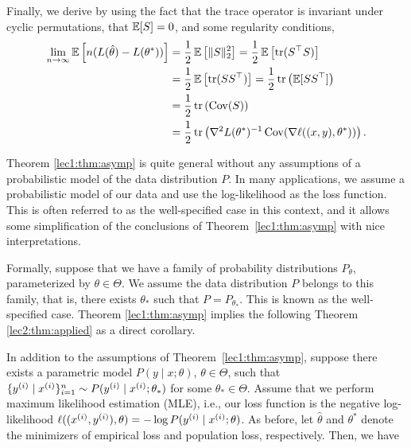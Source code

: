 Finally, we derive  by using the fact that the trace operator is invariant under cyclic permutations,  that $\Exp [S] = 0$, and some regularity conditions,
\begin{align}
    \lim_{n \to \infty} \Exp \left[ n (L(\hat \theta) - L(\theta^*)) \right] &= \frac12 \Exp\left[ \|S\|_2^2 \right] = \frac12 \Exp \left[ \tr(S^\top S) \right] \\
    &= \frac12 \Exp \left[ \tr(S S^\top) \right]  = \frac12 \tr \left(\Exp[S S^\top] \right) \\
    &= \frac12 \tr \left( \Cov(S) \right) \\
    &= \frac12 \tr\left( \nabla^2 L(\theta^*)^{-1} \Cov(\nabla \ell ((x, y), \theta^*)) \right).
\end{align}


Theorem \ref{lec1:thm:asymp} is quite general without any assumptions of a probabilistic model of the data distribution $P$. In many applications, we assume a probabilistic model of our data and use the log-likelihood as the loss function. This is often referred to as the well-specified case in this context, and it allows some simplification of the conclusions of Theorem~\ref{lec1:thm:asymp} with nice interpretations. 


Formally, suppose that we have a family of probability distributions $P_\theta$, parameterized by $\theta \in \Theta$. We assume the data distribution $P$ belongs to this family, that is, there exists $\theta_*$ such that $P = P_{\theta_*}$. This is known as the well-specified case. Theorem \ref{lec1:thm:asymp} implies the following Theorem \ref{lec2:thm:applied} as a direct corollary.

\begin{theorem}
\label{lec2:thm:applied}
    In addition to the assumptions of Theorem~\ref{lec1:thm:asymp}, suppose there exists a parametric model $P(y \mid x; \theta)$, $\theta \in \Theta$, such that $\{ y\sp{i} \mid x\sp{i} \}_{i=1}^n \sim P( y\sp{i} \mid x\sp{i} ; \theta_*)$ for some $\theta_* \in \Theta$. Assume that we perform maximum likelihood estimation (MLE), i.e., our loss function is the negative log-likelihood $\ell((x\sp{i}, y\sp{i}), \theta) = - \log P( y\sp{i} \mid x\sp{i} ; \theta)$. As before, let $\hat\theta$ and $\theta^*$ denote the minimizers of empirical loss and population loss, respectively. Then, we have
    \al{
    \label{lec2:eqn:applied1}
        \theta^* = \theta_*,
    }
\end{theorem}

